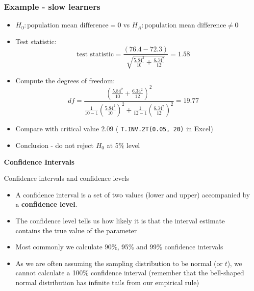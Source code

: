 \documentclass[12pt,xcolor=dvipsnames,handout,mathserif,aspectratio=169]{beamer}
\newcommand{\bbl}[1]{{\color{NavyBlue} \textbf{#1}}}
\begin{document}
\begin{frame}
\frametitle{Example - slow learners}
\begin{itemize}
\item $H_0: \mbox{population mean difference} = 0$ vs $H_A: \mbox{population mean difference} \ne 0$
\item Test statistic:
$$\mbox{test statistic} = \displaystyle\frac{(76.4 - 72.3)}{\sqrt{\frac{5.84^2}{10} + \frac{6.34^2}{12}}} = 1.58$$
\item Compute the degrees of freedom:
$$df = \frac{ \left( \frac{5.84^2}{10} + \frac{6.34^2}{12} \right)^2 }{ \frac{1}{10-1} \left( \frac{5.84^2}{10} \right)^2 + \frac{1}{12-1} \left( \frac{6.34^2}{12} \right)^2 } = 19.77$$
\item Compare with critical value 2.09 ( \texttt{T.INV.2T(0.05, 20)} in Excel)
\item Conclusion - do not reject $H_0$ at 5\% level
\vspace*{0.5cm}
\end{itemize}
\end{frame}

\begin{frame}[fragile]{}
\bbl{\Huge Confidence Intervals}\\ 
\vspace{0.5cm}
\end{frame}

\begin{frame}{Confidence intervals and confidence levels}

\begin{itemize}
\item A confidence interval is a set of two values (lower and upper) accompanied by a \bbl{confidence level}.
\item The confidence level tells us how likely it is that the interval estimate contains the true value of the parameter
\item Most commonly we calculate 90\%, 95\% and 99\% confidence intervals
\item As we are often assuming the sampling distribution to be normal (or $t$), we cannot calculate a 100\% confidence interval (remember that the bell-shaped normal distribution has infinite tails from our empirical rule)
\end{itemize}

\end{frame}
\end{document}
